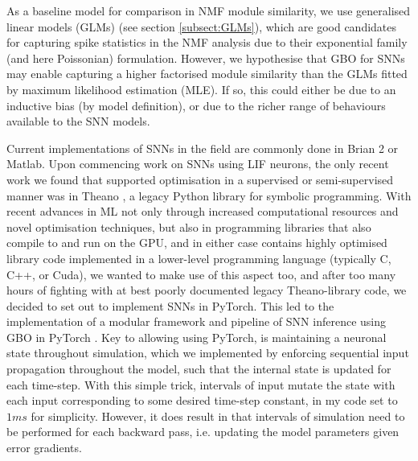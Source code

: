 \documentclass[mphil,deptreport,ianc]{infthesis} %
\begin{document}
As a baseline model for comparison in NMF module similarity, we use generalised linear models (GLMs) (see section \ref{subsect:GLMs}), which are good candidates for capturing spike statistics in the NMF analysis due to their exponential family (and here Poissonian) formulation.
However, we hypothesise that GBO for SNNs may enable capturing a higher factorised module similarity than the GLMs fitted by maximum likelihood estimation (MLE).
If so, this could either be due to an inductive bias (by model definition), or due to the richer range of behaviours available to the SNN models.


Current implementations of SNNs in the field are commonly done in Brian 2 \cite{Goodman2008} or Matlab. 
Upon commencing work on SNNs using LIF neurons, the only recent work we found that supported optimisation in a supervised or semi-supervised manner was in Theano \cite{Bergstra2010}, a legacy Python library for symbolic programming.
With recent advances in ML not only through increased computational resources and novel optimisation techniques, but also in programming libraries that also compile to and run on the GPU, and in either case contains highly optimised library code implemented in a lower-level programming language (typically C, C++, or Cuda), we wanted to make use of this aspect too, and after too many hours of fighting with at best poorly documented legacy Theano-library code, we decided to set out to implement SNNs in PyTorch.
This led to the implementation of a modular framework and pipeline of SNN inference using GBO in PyTorch \cite{Paszke2017, Paszke2019}.
Key to allowing using PyTorch, is maintaining a neuronal state throughout simulation, which we implemented by enforcing sequential input propagation throughout the model, such that the internal state is updated for each time-step.
With this simple trick, intervals of input mutate the state with each input corresponding to some desired time-step constant, in my code set to $1 \si{ms}$ for simplicity.
However, it does result in that intervals of simulation need to be performed for each backward pass, i.e. updating the model parameters given error gradients.
\end{document}

